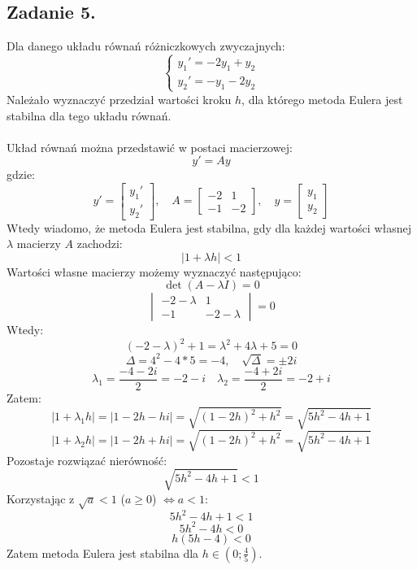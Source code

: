 \documentclass{article}
\begin{document}
\subsection{Zadanie 5.}
Dla danego układu równań różniczkowych zwyczajnych:
\begin{equation}
    \begin{cases}
        y_1' = -2y_1 + y_2 \\
        y_2' = -y_1 - 2y_2
    \end{cases} \nonumber
\end{equation}
Należało wyznaczyć przedział wartości kroku $h$, dla którego metoda Eulera jest stabilna dla tego układu równań.
\\\\
Układ równań można przedstawić w postaci macierzowej:
$$y' = Ay$$
gdzie:
\begin{equation}
    y' =
    \begin{bmatrix}
        y_1' \\ y_2'
    \end{bmatrix}
    ,\quad
    A =
    \begin{bmatrix}
        -2 & 1 \\
        -1 & -2
    \end{bmatrix}
    ,\quad
    y =
    \begin{bmatrix}
        y_1 \\ y_2
    \end{bmatrix}
\nonumber
\end{equation}
Wtedy wiadomo, że metoda Eulera jest stabilna, gdy dla każdej wartości własnej $\lambda$ macierzy $A$ zachodzi:
$$|1 + \lambda h| < 1 $$
Wartości własne macierzy możemy wyznaczyć następująco:
$$\det(A-\lambda I) = 0 $$
\begin{equation}
    \begin{vmatrix}
        -2-\lambda & 1 \\
        -1 & -2-\lambda
    \end{vmatrix}
    = 0
\nonumber
\end{equation}
Wtedy:
$$(-2-\lambda)^2 + 1 = \lambda^2 + 4\lambda + 5 = 0$$
$$\Delta = 4^2 - 4*5 = -4, \quad \sqrt{\Delta} = \pm2i$$
$$\lambda_1 = \frac{-4-2i}{2} = -2-i \quad \lambda_2 = \frac{-4+2i}{2} = -2+i$$
Zatem:
$$|1+\lambda_1 h| = |1-2h-hi| = \sqrt{(1-2h)^2 + h^2} = \sqrt{5h^2 - 4h + 1}$$
$$|1+\lambda_2 h| = |1-2h+hi| = \sqrt{(1-2h)^2 + h^2} = \sqrt{5h^2 - 4h + 1}$$
Pozostaje rozwiązać nierówność:
$$\sqrt{5h^2 - 4h + 1} < 1$$
Korzystając z $\sqrt{a} < 1$ ($a \geq 0$) $\iff a < 1$:
$$5h^2 - 4h + 1 < 1$$
$$5h^2 - 4h < 0$$
$$h(5h - 4) < 0$$
Zatem metoda Eulera jest stabilna dla $h \in ( 0;\frac{4}{5})$.
\end{document}
